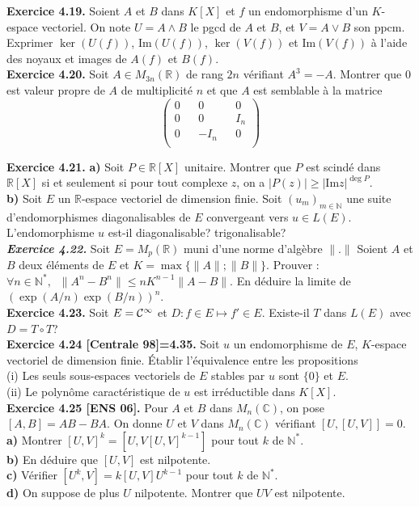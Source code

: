 \documentclass[a4paper,12pt,francais]{article}
\newcommand{\field}[1]{\mathbb{#1}}
\newcommand{\N}{\field{N}}
\newcommand{\R}{\field{R}}
\newcommand{\C}{\field{C}}
\newcommand{\im}{\mbox{Im}}
\begin{document}
\noindent
{\bf Exercice 4.19.} Soient $A$ et $B$ dans $K[X]$ et $f$ un endomorphisme d'un $K$-espace vectoriel. On note $U=A \wedge B$ le pgcd de $A$ et $B$, et $V=A \vee B$ son ppcm. Exprimer $\ker(U(f))$, $\im(U(f))$, $\ker(V(f))$ et $\im(V(f))$ à l'aide des noyaux et images de $A(f)$ et $B(f)$.\\

\noindent
{\bf Exercice 4.20.} Soit $A \in M_{3n}(\R)$ de rang $2n$ vérifiant $A^3=-A$. Montrer que $0$ est valeur propre de $A$ de multiplicité $n$ et que $A$ est semblable à la matrice
$$\left( \begin{array}{ccccc}
0&&0&&0\\
0&&0&&I_n\\
0&&-I_n&&0\\
\end{array} \right)$$

\noindent
{\bf Exercice 4.21.} {\bf a)} Soit $P\in \R[X]$ unitaire. Montrer que $P$ est scindé dans $\R[X]$ si et seulement si pour tout complexe $z$, on a $|P(z)|\geqslant |\im z|^{\deg P}$.\\
{\bf b)} Soit $E$ un $\R$-espace vectoriel de dimension finie. Soit $(u_m)_{m\in \N}$ une suite d'endomorphismes diagonalisables de $E$ convergeant vers $u\in L(E)$. L'endomorphisme $u$ est-il diagonalisable? trigonalisable?\\

\noindent
{\bf \it Exercice 4.22.} Soit $E=M_p(\R)$ muni d'une norme d'algèbre $\|.\|$ Soient $A$ et $B$ deux éléments de $E$ et $K=\max \{\|A\|;\|B\|\}.$ Prouver : $\forall n \in \N^*,\; \; \| A^n-B^n \| \leqslant n K^{n-1} \| A-B \|$. En déduire la limite de $(\exp(A/n) \exp(B/n))^n$.\\

\noindent
{\bf Exercice 4.23.} Soit $E={\cal{C}}^\infty$ et $D:f\in E \mapsto f'\in E$. Existe-il $T$ dans $L(E)$ avec $D=T \circ T$?\\

\noindent
{\bf Exercice 4.24 [Centrale 98]=4.35.} Soit $u$ un endomorphisme de $E$, $K$-espace vectoriel de dimension finie. \'Etablir l'équivalence entre les propositions\\
\indent
(i) Les seuls sous-espaces vectoriels de $E$ stables par $u$ sont $\{0\}$ et $E$.\\
\indent
(ii) Le polynôme caractéristique de $u$ est irréductible dans $K[X]$.\\

\noindent
{\bf Exercice 4.25 [ENS 06].} Pour $A$ et $B$ dans $M_n(\C)$, on pose $[A,B]=AB-BA$. On donne $U$ et $V$ dans $M_n(\C)$ vérifiant $[U,[U,V]]=0$.\\
\indent
{\bf a)} Montrer $[U,V]^k=[U,V[U,V]^{k-1}]$ pour tout $k$ de $\N^*$.\\
\indent
{\bf b)} En déduire que $[U,V]$ est nilpotente.\\
\indent
{\bf c)} Vérifier $[U^k,V]=k[U,V]U^{k-1}$ pour tout $k$ de $\N^*$.\\
\indent
{\bf d)} On suppose de plus $U$ nilpotente. Montrer que $UV$ est nilpotente.\\
\end{document}
